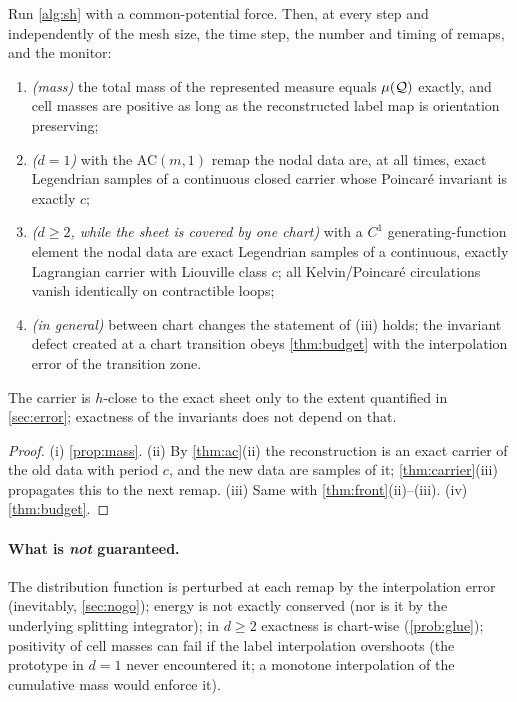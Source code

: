 \begin{theorem}\label{thm:scheme}
Run \cref{alg:sh} with a common-potential force. Then, at every step and independently of the mesh size, the
time step, the number and timing of remaps, and the monitor:
\begin{enumerate}[label=(\roman*),leftmargin=2.2em,itemsep=1pt]
\item \emph{(mass)} the total mass of the represented measure equals $\mu(\mathcal{Q})$ exactly, and cell masses are positive as long as the reconstructed label map is orientation preserving;
\item \emph{($d=1$)} with the AC$(m,1)$ remap the nodal data are, at all times, exact Legendrian samples of a continuous closed carrier whose Poincar\'e invariant is exactly $c$;
\item \emph{($d\ge2$, while the sheet is covered by one chart)} with a $C^1$ generating-function element the nodal data are exact Legendrian samples of a continuous, exactly Lagrangian carrier with Liouville class $c$; all Kelvin/Poincar\'e circulations vanish identically on contractible loops;
\item \emph{(in general)} between chart changes the statement of (iii) holds; the invariant defect created at a chart transition obeys \cref{thm:budget} with the interpolation error of the transition zone.
\end{enumerate}
The carrier is $h$-close to the exact sheet only to the extent quantified in \cref{sec:error}; exactness of the
invariants does not depend on that.
\end{theorem}
\begin{proof}
(i) \cref{prop:mass}. (ii) By \cref{thm:ac}(ii) the reconstruction is an exact carrier of the old data with period
$c$, and the new data are samples of it; \cref{thm:carrier}(iii) propagates this to the next remap. (iii) Same with
\cref{thm:front}(ii)--(iii). (iv) \cref{thm:budget}.
\end{proof}

\paragraph{What is \emph{not} guaranteed.} The distribution function is perturbed at each remap by the
interpolation error (inevitably, \cref{sec:nogo}); energy is not exactly conserved (nor is it by the underlying
splitting integrator); in $d\ge2$ exactness is chart-wise (\cref{prob:glue}); positivity of cell masses can fail
if the label interpolation overshoots (the prototype in $d=1$ never encountered it; a monotone interpolation of
the cumulative mass would enforce it).

